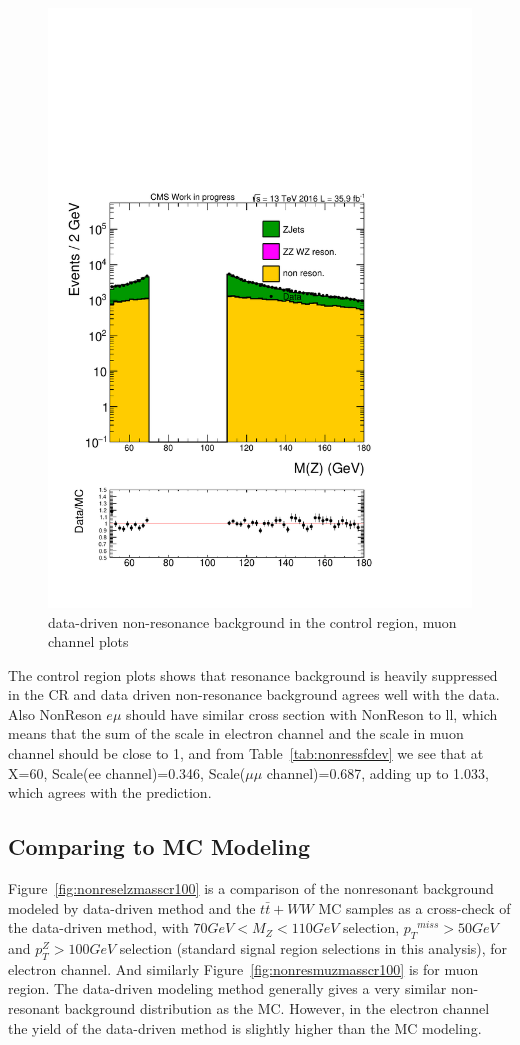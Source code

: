 \begin{figure}[htbp]
\begin{center}
\includegraphics[width=0.39\linewidth, page=4]{figures/test_metzpt50_RhoWt_puWeight68075_metfilter_mu_.pdf}
\caption{data-driven non-resonance background in the control region, muon channel plots}
\label{fig:nonresmucr}
\end{center}
\end{figure}

\vspace{0.3cm}
The control region plots shows that resonance background is heavily suppressed in the CR and data driven non-resonance background agrees well with the data. Also NonReson $e\mu$ should have similar cross section with NonReson to ll, which means that the sum of the scale in electron channel and the scale in muon channel should be close to 1, and from Table~\ref{tab:nonressfdev} we see that at X=60, Scale(ee channel)=0.346, Scale($\mu\mu$ channel)=0.687, adding up to 1.033, which agrees with the prediction.

\subsection{Comparing to MC Modeling}
Figure~\ref{fig:nonreselzmasscr100} is a comparison of the nonresonant background modeled by data-driven method and the $t\bar{t}+WW$ MC samples as a cross-check of the data-driven method, with $70GeV<M_{Z}<110GeV$ selection, ${p_{T}}^{miss}>50GeV$ and $p_{T}^{Z}>100GeV$ selection (standard signal region selections in this analysis), for electron channel. And similarly Figure~\ref{fig:nonresmuzmasscr100} is for muon region. The data-driven modeling method generally gives a very similar non-resonant background distribution as the MC. However, in the electron channel the yield of the data-driven method is slightly higher than the MC modeling.

